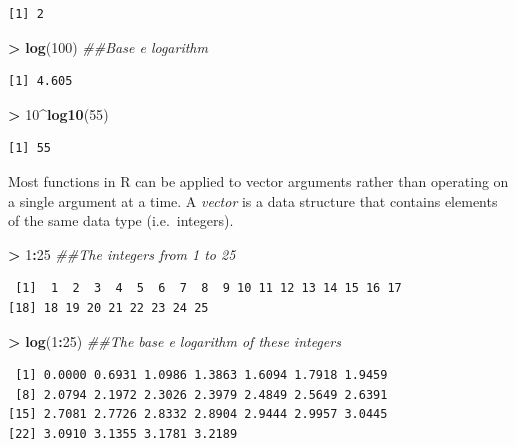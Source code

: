 \documentclass[]{krantz}
\makeatletter
\newenvironment{Shaded}{\begin{snugshade}}{\end{snugshade}}
\newcommand{\CommentTok}[1]{\textcolor[rgb]{0.37,0.37,0.37}{\textit{#1}}}
\newcommand{\DecValTok}[1]{\textcolor[rgb]{0.06,0.06,0.06}{#1}}
\newcommand{\KeywordTok}[1]{\textcolor[rgb]{0.27,0.27,0.27}{\textbf{#1}}}
\newcommand{\NormalTok}[1]{#1}
\newcommand{\OperatorTok}[1]{\textcolor[rgb]{0.43,0.43,0.43}{\textbf{#1}}}
\newcommand{\StringTok}[1]{\textcolor[rgb]{0.5,0.5,0.5}{#1}}
\newenvironment{kframe}{%
\medskip{}
\setlength{\fboxsep}{.8em}
 \def\at@end@of@kframe{}%
 \ifinner\ifhmode%
  \def\at@end@of@kframe{\end{minipage}}%
  \begin{minipage}{\columnwidth}%
 \fi\fi%
 \def\FrameCommand##1{\hskip\@totalleftmargin \hskip-\fboxsep
 \colorbox{shadecolor}{##1}\hskip-\fboxsep
     \hskip-\linewidth \hskip-\@totalleftmargin \hskip\columnwidth}%
 \MakeFramed {\advance\hsize-\width
   \@totalleftmargin\z@ \linewidth\hsize
   \@setminipage}}%
 {\par\unskip\endMakeFramed%
 \at@end@of@kframe}
\renewenvironment{Shaded}{\begin{kframe}}{\end{kframe}}
\makeatother
\begin{document}
\begin{verbatim}
[1] 2
\end{verbatim}

\begin{Shaded}
\begin{Highlighting}[]
\OperatorTok{>}\StringTok{ }\KeywordTok{log}\NormalTok{(}\DecValTok{100}\NormalTok{)  }\CommentTok{##Base e logarithm}
\end{Highlighting}
\end{Shaded}

\begin{verbatim}
[1] 4.605
\end{verbatim}

\begin{Shaded}
\begin{Highlighting}[]
\OperatorTok{>}\StringTok{ }\DecValTok{10}\OperatorTok{^}\KeywordTok{log10}\NormalTok{(}\DecValTok{55}\NormalTok{)}
\end{Highlighting}
\end{Shaded}

\begin{verbatim}
[1] 55
\end{verbatim}

Most functions in R can be applied to vector arguments rather than operating on a single argument at a time. A \emph{vector} is a data structure that contains elements of the same data type (i.e.~integers).

\begin{Shaded}
\begin{Highlighting}[]
\OperatorTok{>}\StringTok{ }\DecValTok{1}\OperatorTok{:}\DecValTok{25}  \CommentTok{##The integers from 1 to 25}
\end{Highlighting}
\end{Shaded}

\begin{verbatim}
 [1]  1  2  3  4  5  6  7  8  9 10 11 12 13 14 15 16 17
[18] 18 19 20 21 22 23 24 25
\end{verbatim}

\begin{Shaded}
\begin{Highlighting}[]
\OperatorTok{>}\StringTok{ }\KeywordTok{log}\NormalTok{(}\DecValTok{1}\OperatorTok{:}\DecValTok{25}\NormalTok{)  }\CommentTok{##The base e logarithm of these integers}
\end{Highlighting}
\end{Shaded}

\begin{verbatim}
 [1] 0.0000 0.6931 1.0986 1.3863 1.6094 1.7918 1.9459
 [8] 2.0794 2.1972 2.3026 2.3979 2.4849 2.5649 2.6391
[15] 2.7081 2.7726 2.8332 2.8904 2.9444 2.9957 3.0445
[22] 3.0910 3.1355 3.1781 3.2189
\end{verbatim}
\end{document}
